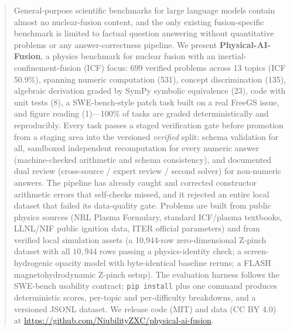 \begin{abstract}
General-purpose scientific benchmarks for large language models contain almost no nuclear-fusion content, and the only existing fusion-specific benchmark is limited to factual question answering without quantitative problems or any answer-correctness pipeline. We present \textbf{Physical-AI-Fusion}, a physics benchmark for nuclear fusion with an inertial-confinement-fusion (ICF) focus: 699 verified problems across 13 topics (ICF 50.9\%), spanning numeric computation (531), concept discrimination (135), algebraic derivation graded by SymPy symbolic equivalence (23), code with unit tests (8), a SWE-bench-style patch task built on a real FreeGS issue, and figure reading (1)---100\% of tasks are graded deterministically and reproducibly. Every task passes a staged verification gate before promotion from a staging area into the versioned \emph{verified} split: schema validation for all, sandboxed independent recomputation for every numeric answer (machine-checked arithmetic and schema consistency), and documented dual review (cross-source / expert review / second solver) for non-numeric answers. The pipeline has already caught and corrected constructor arithmetic errors that self-checks missed, and it rejected an entire local dataset that failed its data-quality gate. Problems are built from public physics sources (NRL Plasma Formulary, standard ICF/plasma textbooks, LLNL/NIF public ignition data, ITER official parameters) and from verified local simulation assets (a 10{,}944-row zero-dimensional Z-pinch dataset with all $10{,}944$ rows passing a physics-identity check; a screen-hydrogenic opacity model with byte-identical baseline reruns; a FLASH magnetohydrodynamic Z-pinch setup). The evaluation harness follows the SWE-bench usability contract: \texttt{pip install} plus one command produces deterministic scores, per-topic and per-difficulty breakdowns, and a versioned JSONL dataset. We release code (MIT) and data (CC BY 4.0) at \url{https://github.com/NiubilityZXC/physical-ai-fusion}.
\end{abstract}
